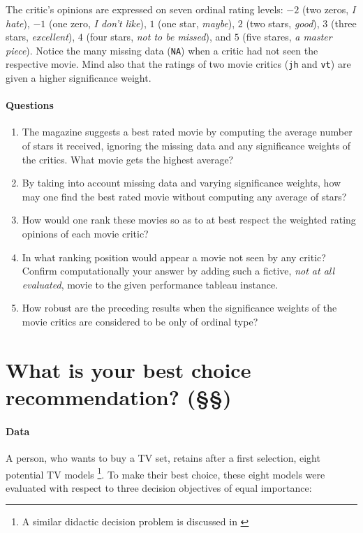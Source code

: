 The critic's opinions are expressed on seven ordinal rating levels: $-2$ (two zeros, \emph{I hate}), $-1$ (one zero, \emph{I don't like}), $1$ (one star, \emph{maybe}), $2$ (two stars, \emph{good}), $3$ (three stars, \emph{excellent}), $4$ (four stars, \emph{not to be missed}), and $5$ (five stares, \emph{a master piece}). Notice the many missing data (\texttt{NA}) when a critic had not seen the respective movie. Mind also that the ratings of two movie critics (\texttt{jh} and \texttt{vt}) are given a higher significance weight.

\paragraph{\textbf{Questions}}

\begin{enumerate}
\item The \Graffiti magazine suggests a best rated movie by computing the average number of stars it received, ignoring the missing data and any significance weights of the critics. What movie gets the highest average? 
\item By taking into account missing data and varying significance weights, how may one find the best rated movie without computing any average of stars?
\item How would one rank these movies so as to at best respect the weighted rating opinions of each movie critic?
\item In what ranking position would appear a movie not seen by any critic? Confirm computationally your answer by adding such a fictive, \emph{not at all evaluated}, movie to the given performance tableau instance.
\item How robust are the preceding results when the significance weights of the movie critics are considered to be only of ordinal type?
\end{enumerate}

\section{What is your best choice recommendation? (§§)}
\label{sec:15.3}


\paragraph{\textbf{Data}}

A person, who wants to buy a TV set, retains after a first selection, eight potential TV models \footnote{A similar didactic decision problem is discussed in \citet[pp.33-35]{VIN-1992}}. To make their best choice, these eight models were evaluated with respect to three decision objectives of equal importance:

